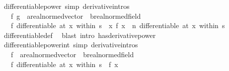 \begin{isabellebody}
\isanewline
%
\endisadelimproof
\isanewline
{}\isamarkupfalse%
\ differentiable{\isacharunderscore}{\kern0pt}power\ {\isacharbrackleft}{\kern0pt}simp{\isacharcomma}{\kern0pt}\ derivative{\isacharunderscore}{\kern0pt}intros{\isacharbrackright}{\kern0pt}{\isacharcolon}{\kern0pt}\isanewline
\ \ \ f\ g\ {\isacharcolon}{\kern0pt}{\isacharcolon}{\kern0pt}\ {\isachardoublequoteopen}{\isacharprime}{\kern0pt}a{\isacharcolon}{\kern0pt}{\isacharcolon}{\kern0pt}real{\isacharunderscore}{\kern0pt}normed{\isacharunderscore}{\kern0pt}vector\ {\isasymRightarrow}\ {\isacharprime}{\kern0pt}b{\isacharcolon}{\kern0pt}{\isacharcolon}{\kern0pt}real{\isacharunderscore}{\kern0pt}normed{\isacharunderscore}{\kern0pt}field{\isachardoublequoteclose}\isanewline
\ \ \ {\isachardoublequoteopen}f\ differentiable\ {\isacharparenleft}{\kern0pt}at\ x\ within\ s{\isacharparenright}{\kern0pt}\ {\isasymLongrightarrow}\ {\isacharparenleft}{\kern0pt}{\isasymlambda}x{\isachardot}{\kern0pt}\ f\ x\ {\isacharcircum}{\kern0pt}\ n{\isacharparenright}{\kern0pt}\ differentiable\ {\isacharparenleft}{\kern0pt}at\ x\ within\ s{\isacharparenright}{\kern0pt}{\isachardoublequoteclose}\isanewline
%
\isadelimproof
\ \ %
\endisadelimproof
%
\isatagproof
{}\isamarkupfalse%
\ differentiable{\isacharunderscore}{\kern0pt}def\ \isamarkupfalse%
\ {\isacharparenleft}{\kern0pt}blast\ intro{\isacharcolon}{\kern0pt}\ has{\isacharunderscore}{\kern0pt}derivative{\isacharunderscore}{\kern0pt}power{\isacharparenright}{\kern0pt}%
\endisatagproof
{\isafoldproof}%
%
\isadelimproof
\isanewline
%
\endisadelimproof
\isanewline
{}\isamarkupfalse%
\ differentiable{\isacharunderscore}{\kern0pt}power{\isacharunderscore}{\kern0pt}int\ {\isacharbrackleft}{\kern0pt}simp{\isacharcomma}{\kern0pt}\ derivative{\isacharunderscore}{\kern0pt}intros{\isacharbrackright}{\kern0pt}{\isacharcolon}{\kern0pt}\isanewline
\ \ \ f\ {\isacharcolon}{\kern0pt}{\isacharcolon}{\kern0pt}\ {\isachardoublequoteopen}{\isacharprime}{\kern0pt}a{\isacharcolon}{\kern0pt}{\isacharcolon}{\kern0pt}real{\isacharunderscore}{\kern0pt}normed{\isacharunderscore}{\kern0pt}vector\ {\isasymRightarrow}\ {\isacharprime}{\kern0pt}b{\isacharcolon}{\kern0pt}{\isacharcolon}{\kern0pt}real{\isacharunderscore}{\kern0pt}normed{\isacharunderscore}{\kern0pt}field{\isachardoublequoteclose}\isanewline
\ \ \ {\isachardoublequoteopen}f\ differentiable\ {\isacharparenleft}{\kern0pt}at\ x\ within\ s{\isacharparenright}{\kern0pt}\ {\isasymLongrightarrow}\ f\ x\ {\isasymnoteq}\ {}\ {\isasymLongrightarrow}\isanewline

\end{isabellebody}
